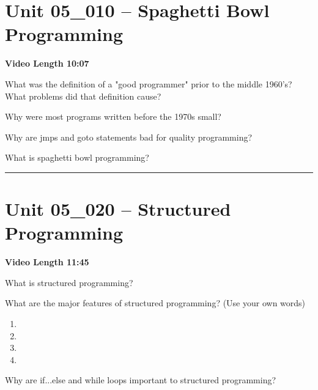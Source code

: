 \documentclass[letterpaper,12pt]{exam}
\newcommand{\unit}{Unit 05}
\begin{document}

\section*{\unit\_010 -- Spaghetti Bowl Programming}
\par{\selectfont\textbf{Video Length 10:07}}
\begin{questions}

\begin{samepage}
    \question What was the definition of a "good programmer" prior to the middle 1960's? What problems did that definition cause?
    \vspace{5mm}
\end{samepage}

\begin{samepage}
    \question Why were most programs written before the 1970s small?
    \vspace{5mm}
\end{samepage}
\par
 \begin{samepage}
     \question Why are jmps and goto statements bad for quality programming?
     \vspace{5mm}
 \end{samepage}
 \par
  \begin{samepage}
      \question What is spaghetti bowl programming?
      \vspace{5mm}
  \end{samepage}
  \par
  \rule{0.5\textwidth}{.4pt} %

\section*{\unit\_020 -- Structured Programming}
\par{\selectfont\textbf{Video Length 11:45}}
\begin{samepage}
    \question What is structured programming?
    \vspace{5mm}
\end{samepage}
\par
What are the major features of structured programming? (Use your own words)
\begin{enumerate}
    \item
    \vspace{5mm}
    \item
    \vspace{5mm}
    \item
    \vspace{5mm}
    \item
\end{enumerate}
\begin{samepage}
    \question Why are if...else and while loops important to structured programming?
    \vspace{5mm}
\end{samepage}
\par
 

\end{questions}
\end{document}
